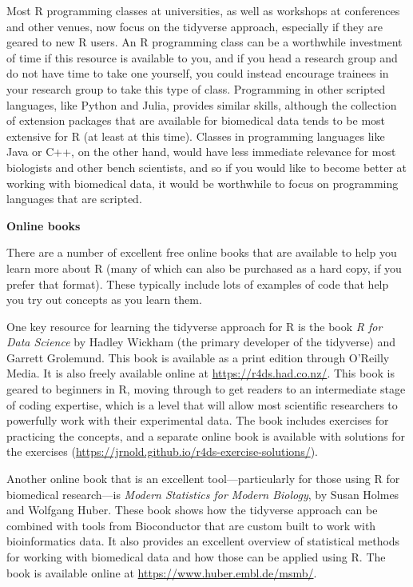 \documentclass[]{tufte-book}
\begin{document}
Most R programming classes at universities, as well as workshops at conferences
and other venues, now focus on the tidyverse approach, especially if they are
geared to new R users. An R programming class can be a worthwhile investment of
time if this resource is available to you, and if you head a research group and
do not have time to take one yourself, you could instead encourage
trainees in your research group to take this type of class. Programming in other
scripted languages, like Python and Julia, provides similar skills, although the
collection of extension packages that are available for biomedical data tends to
be most extensive for R (at least at this time). Classes in programming
languages like Java or C++, on the other hand, would have less immediate
relevance for most biologists and other bench scientists, and so if you would
like to become better at working with biomedical data, it would be worthwhile to
focus on programming languages that are scripted.

\textbf{Online books}

There are a number of excellent free online books that are available to help
you learn more about R (many of which can also be purchased as a hard copy, if
you prefer that format). These typically include lots of examples of code that
help you try out concepts as you learn them.

One key resource for learning the tidyverse approach for R is the book \emph{R for
Data Science} by Hadley Wickham (the primary developer of the tidyverse) and
Garrett Grolemund. This book is available as a print edition through O'Reilly
Media. It is also freely available online at \url{https://r4ds.had.co.nz/}. This book
is geared to beginners in R, moving through to get readers to an intermediate
stage of coding expertise, which is a level that will allow most scientific
researchers to powerfully work with their experimental data. The book includes
exercises for practicing the concepts, and a separate online book is available
with solutions for the exercises
(\url{https://jrnold.github.io/r4ds-exercise-solutions/}).

Another online book that is an excellent tool---particularly for those using
R for biomedical research---is \emph{Modern Statistics for Modern Biology}, by
Susan Holmes and Wolfgang Huber. These book shows how the tidyverse approach
can be combined with tools from Bioconductor that are custom built to
work with bioinformatics data. It also provides an excellent overview of
statistical methods for working with biomedical data and how those can be
applied using R. The book is available online at \url{https://www.huber.embl.de/msmb/}.
\end{document}
